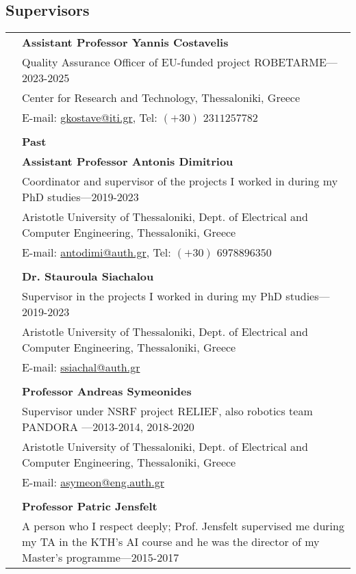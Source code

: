 \documentclass[a4paper,10pt,twoside]{article}
\begin{document}
\subsection*{Supervisors}
\vspace{0.5cm}
\begin{tabular}{rp{14cm}}
& \textbf{Assistant Professor Yannis Costavelis} \\
& {Quality Assurance Officer of EU-funded project ROBETARME}---2023-2025\\
& Center for Research and Technology, Thessaloniki, Greece \\
& E-mail: \href{mailto: gkostave@iti.gr}{gkostave@iti.gr}, Tel: $(+30)$ $2311 257782$ \\
&\\
& \textbf{Past}  \vspace{0.15cm} \\
& \textbf{Assistant Professor Antonis Dimitriou} \\
& {Coordinator and supervisor of the projects I worked in during my PhD studies}---2019-2023\\
&Aristotle University of Thessaloniki, Dept. of Electrical and Computer Engineering, Thessaloniki, Greece \\
& E-mail: \href{mailto: antodimi@auth.gr}{antodimi@auth.gr}, Tel: $(+30)$ $697 889 6350$ \\
&\\
& \textbf{Dr. Stauroula Siachalou} \\
& {Supervisor in the projects I worked in during my PhD studies}---2019-2023\\
&Aristotle University of Thessaloniki, Dept. of Electrical and Computer Engineering, Thessaloniki, Greece \\
& E-mail: \href{mailto: ssiachal@auth.gr}{ssiachal@auth.gr} \\
&\\
& \textbf{Professor Andreas Symeonides} \\
& {Supervisor under NSRF project RELIEF, also robotics team PANDORA }---2013-2014, 2018-2020\\
&Aristotle University of Thessaloniki, Dept. of Electrical and Computer Engineering, Thessaloniki, Greece \\
& E-mail: \href{mailto: asymeon@eng.auth.gr}{asymeon@eng.auth.gr} \\
&\\
& \textbf{Professor Patric Jensfelt}\\
& {A person who I respect deeply; Prof. Jensfelt supervised me during my TA in the KTH's AI course and he was the director of my Master's programme}---2015-2017\\

\end{tabular}
\end{document}
